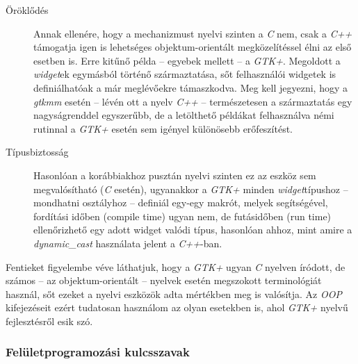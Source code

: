 \documentclass[a4paper,10pt]{article}
\begin{document}
\begin{description}
 \item[Öröklődés] Annak ellenére, hogy a mechanizmust nyelvi szinten a \textit{C} nem, csak a \textit{C++} támogatja igen is lehetséges objektum-orientált megközelítéssel élni az első esetben is. Erre kitűnő példa -- egyebek mellett -- a \textit{GTK+}. Megoldott a \textit{widget}ek egymásból történő származtatása, sőt felhasználói widgetek is definiálhatóak a már meglévőekre támaszkodva. Meg kell jegyezni, hogy a \textit{gtkmm} esetén -- lévén ott a nyelv \textit{C++} -- természetesen a származtatás egy nagyságrenddel egyszerűbb, de a letölthető példákat felhasználva némi rutinnal a \textit{GTK+} esetén sem igényel különösebb erőfeszítést.

 \item[Típusbiztosság] Hasonlóan a korábbiakhoz pusztán nyelvi szinten ez az eszköz sem megvalósítható (\textit{C} esetén), ugyanakkor a \textit{GTK+} minden \textit{widget}típushoz -- mondhatni osztályhoz -- definiál egy-egy makrót, melyek segítségével, fordítási időben (compile time) ugyan nem, de futásidőben (run time) ellenőrizhető egy adott widget valódi típus, hasonlóan ahhoz, mint amire a \textit{dynamic\_cast} használata jelent a \textit{C++}-ban.
\end{description}

Fentieket figyelembe véve láthatjuk, hogy a \textit{GTK+} ugyan \textit{C} nyelven íródott, de számos -- az objektum-orientált -- nyelvek esetén megszokott terminológiát használ, sőt ezeket a nyelvi eszközök adta mértékben meg is valósítja. Az \textit{OOP} kifejezéseit ezért tudatosan használom az olyan esetekben is, ahol \textit{GTK+} nyelvű fejlesztésről esik szó.

\subsubsection{Felületprogramozási kulcsszavak}
\end{document}
